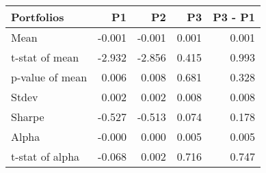 \begin{tabular}{lrrrr}
\toprule
Portfolios & P1 & P2 & P3 & P3 - P1 \\
\midrule
Mean & -0.001 & -0.001 & 0.001 & 0.001 \\
t-stat of mean & -2.932 & -2.856 & 0.415 & 0.993 \\
p-value of mean & 0.006 & 0.008 & 0.681 & 0.328 \\
Stdev & 0.002 & 0.002 & 0.008 & 0.008 \\
Sharpe & -0.527 & -0.513 & 0.074 & 0.178 \\
Alpha & -0.000 & 0.000 & 0.005 & 0.005 \\
t-stat of alpha & -0.068 & 0.002 & 0.716 & 0.747 \\
\bottomrule
\end{tabular}
